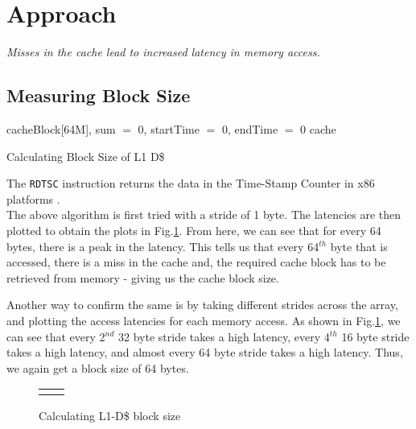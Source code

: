 \documentclass[12pt,a4paper,english]{paper}
\newenvironment{formalblue}{%
  \def\FrameCommand{%
    \hspace{1pt}%
    {\color{blue}\vrule width 2pt}%
    {\color{formalblue}\vrule width 4pt}%
    \colorbox{formalblue}%
  }%
  \MakeFramed{\advance\hsize-\width\FrameRestore}%
  \noindent\hspace{-4.55pt}%
  \begin{adjustwidth}{7pt}{}%
  \vspace{2pt}\vspace{2pt}%
}
{%
  \vspace{2pt}\end{adjustwidth}\endMakeFramed%
}
\begin{document}
\section{Approach}
\begin{formalblue}
    \textsl{Misses in the cache lead to increased latency in memory access.}
\end{formalblue}

\subsection{Measuring Block Size}
\begin{algorithm}[H]
\SetAlgoLined
{}
 
  \init cacheBlock[64M], sum $=$ 0, startTime $=$ 0, endTime $=$ 0\; 
  \clear cache\;
 \caption{Calculating Block Size of L1 D\$}
\end{algorithm}

The \texttt{RDTSC} instruction returns the data in the Time-Stamp Counter in x86 platforms \cite{intel_2021}.\\

The above algorithm is first tried with a stride of 1 byte. The latencies are then plotted to obtain the plots in Fig.\ref{Fig:blockSize}. From here, we can see that for every 64 bytes, there is a peak in the latency. This tells us that every 64$^{th}$ byte that is accessed, there is a miss in the cache and, the required cache block has to be retrieved from memory - giving us the cache block size.

Another way to confirm the same is by taking different strides across the array, and plotting the access latencies for each memory access. As shown in Fig.\ref{Fig:blockSize}, we can see that every 2$^{nd}$ 32 byte stride takes a high latency, every 4$^{th}$ 16 byte stride takes a high latency, and almost every 64 byte stride takes a high latency. Thus, we again get a block size of 64 bytes.

\begin{figure}[H]
    \centering
    \setlength\tabcolsep{1pt}
    \begin{tabular}{cc}
        \def\svgwidth{0.5\columnwidth}
        &
        \def\svgwidth{0.5\columnwidth}
        
    \end{tabular}
    \caption{Calculating L1-D\$ block size}
    \label{Fig:blockSize}
\end{figure}
\end{document}
